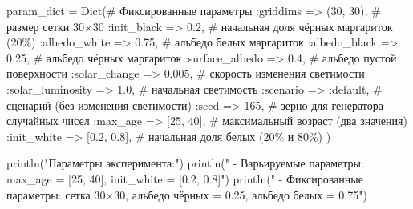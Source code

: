 \documentclass[
  12pt,
  a4paper,
  DIV=11,
  numbers=noendperiod]{scrreprt}
\newenvironment{Shaded}{\begin{snugshade}}{\end{snugshade}}
\newcommand{\CommentTok}[1]{\textcolor[rgb]{0.37,0.37,0.37}{#1}}
\newcommand{\FloatTok}[1]{\textcolor[rgb]{0.68,0.00,0.00}{#1}}
\newcommand{\FunctionTok}[1]{\textcolor[rgb]{0.28,0.35,0.67}{#1}}
\newcommand{\NormalTok}[1]{\textcolor[rgb]{0.00,0.23,0.31}{#1}}
\newcommand{\OperatorTok}[1]{\textcolor[rgb]{0.37,0.37,0.37}{#1}}
\newcommand{\StringTok}[1]{\textcolor[rgb]{0.13,0.47,0.30}{#1}}
\begin{document}
\begin{Shaded}
\begin{Highlighting}[]
\NormalTok{param\_dict }\OperatorTok{=} \FunctionTok{Dict}\NormalTok{(}\CommentTok{\# Фиксированные параметры}
    \OperatorTok{:}\NormalTok{griddims }\OperatorTok{=\textgreater{}}\NormalTok{ (}\FloatTok{30}\NormalTok{, }\FloatTok{30}\NormalTok{),           }\CommentTok{\# размер сетки 30×30}
    \OperatorTok{:}\NormalTok{init\_black }\OperatorTok{=\textgreater{}} \FloatTok{0.2}\NormalTok{,               }\CommentTok{\# начальная доля чёрных маргариток (20\%)}
    \OperatorTok{:}\NormalTok{albedo\_white }\OperatorTok{=\textgreater{}} \FloatTok{0.75}\NormalTok{,             }\CommentTok{\# альбедо белых маргариток}
    \OperatorTok{:}\NormalTok{albedo\_black }\OperatorTok{=\textgreater{}} \FloatTok{0.25}\NormalTok{,             }\CommentTok{\# альбедо чёрных маргариток}
    \OperatorTok{:}\NormalTok{surface\_albedo }\OperatorTok{=\textgreater{}} \FloatTok{0.4}\NormalTok{,            }\CommentTok{\# альбедо пустой поверхности}
    \OperatorTok{:}\NormalTok{solar\_change }\OperatorTok{=\textgreater{}} \FloatTok{0.005}\NormalTok{,            }\CommentTok{\# скорость изменения светимости}
    \OperatorTok{:}\NormalTok{solar\_luminosity }\OperatorTok{=\textgreater{}} \FloatTok{1.0}\NormalTok{,          }\CommentTok{\# начальная светимость}
    \OperatorTok{:}\NormalTok{scenario }\OperatorTok{=\textgreater{}} \OperatorTok{:}\NormalTok{default,              }\CommentTok{\# сценарий (без изменения светимости)}
    \OperatorTok{:}\NormalTok{seed }\OperatorTok{=\textgreater{}} \FloatTok{165}\NormalTok{,                       }\CommentTok{\# зерно для генератора случайных чисел}
    \OperatorTok{:}\NormalTok{max\_age }\OperatorTok{=\textgreater{}}\NormalTok{ [}\FloatTok{25}\NormalTok{, }\FloatTok{40}\NormalTok{],               }\CommentTok{\# максимальный возраст (два значения)}
    \OperatorTok{:}\NormalTok{init\_white }\OperatorTok{=\textgreater{}}\NormalTok{ [}\FloatTok{0.2}\NormalTok{, }\FloatTok{0.8}\NormalTok{],           }\CommentTok{\# начальная доля белых (20\% и 80\%)}
\NormalTok{)}

\FunctionTok{println}\NormalTok{(}\StringTok{"Параметры эксперимента:"}\NormalTok{)}
\FunctionTok{println}\NormalTok{(}\StringTok{"   {-} Варьируемые параметры: max\_age = [25, 40], init\_white = [0.2, 0.8]"}\NormalTok{)}
\FunctionTok{println}\NormalTok{(}\StringTok{"   {-} Фиксированные параметры: сетка 30×30, альбедо чёрных = 0.25, альбедо белых = 0.75"}\NormalTok{)}
\end{Highlighting}
\end{Shaded}
\end{document}
